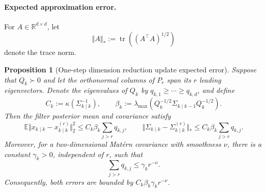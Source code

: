 \documentclass[a4paper,12pt]{article}
\newtheorem{proposition}[theorem]{Proposition}
\begin{document}
\paragraph{Expected approximation error.}
For $A \in \mathbb{R}^{d \times d}$, let
\begin{equation}
    \Vert A \Vert_{*} := \operatorname{tr}\left( (A^{\top} A)^{1/2} \right)
\end{equation}
denote the trace norm.
\begin{proposition}[One-step dimension reduction update expected error]\label{prop:onestep}
    Suppose that $Q_k \succ 0$ and let the orthonormal columns of $P_r$ span its $r$ leading eigenvectors.
    Denote the eigenvalues of $Q_k$ by $q_{k,1} \geq \cdots \geq q_{k,d}$, and define
    \begin{equation}
        C_k := \kappa(\Sigma_{k \mid k}^{-1}), \qquad
        \beta_k := \lambda_{\max}(Q_{k}^{-1/2} \Sigma_{k\mid k-1} Q_{k}^{-1/2}).
    \end{equation}
    Then the filter posterior mean and covariance satisfy
    \begin{equation}
        \mathbb{E} \Vert x_{k \mid k} - x_{k \mid k}^{(r)} \Vert_{2}^{2} \leq C_k \beta_k \sum_{j > r} q_{k,j}, \qquad
        \Vert \Sigma_{k \mid k} - \Sigma_{k \mid k}^{(r)} \Vert_{*} \leq  C_k \beta_k \sum_{j > r} q_{k,j}.
    \end{equation}
    Moreover, for a two-dimensional Matérn covariance with smoothness $\nu$, there is a constant $\gamma_k > 0$, independent of $r$, such that
    \begin{equation}
        \sum_{j > r} q_{k,j} \leq \gamma_k r^{-\nu}.
    \end{equation}
    Consequently, both errors are bounded by $C_k \beta_k \gamma_k r^{-\nu}$.
\end{proposition}
\end{document}
